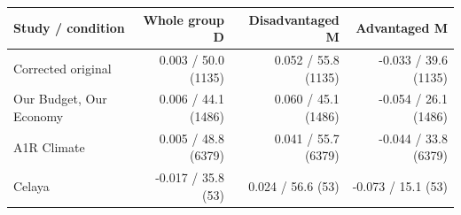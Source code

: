 
\begin{tabular}{lrrr}
\toprule
Study / condition & Whole group D & Disadvantaged M & Advantaged M\\
\midrule
Corrected original & 0.003 / 50.0 (1135) & 0.052 / 55.8 (1135) & -0.033 / 39.6 (1135)\\
Our Budget, Our Economy & 0.006 / 44.1 (1486) & 0.060 / 45.1 (1486) & -0.054 / 26.1 (1486)\\
A1R Climate & 0.005 / 48.8 (6379) & 0.041 / 55.7 (6379) & -0.044 / 33.8 (6379)\\
Celaya & -0.017 / 35.8 (53) & 0.024 / 56.6 (53) & -0.073 / 15.1 (53)\\
\bottomrule
\end{tabular}
